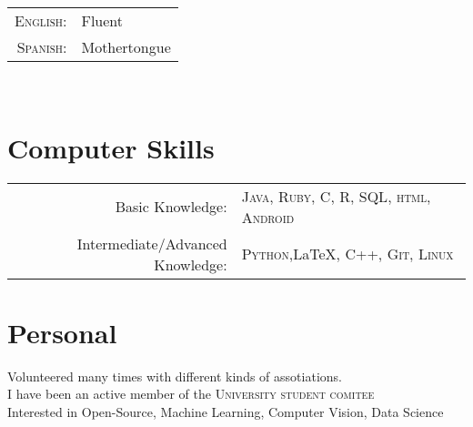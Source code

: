 \documentclass[a4paper,11pt]{article} %
\begin{document}
\begin{tabular}{rl}
\textsc{English:} & Fluent\\

\textsc{Spanish:} & Mothertongue\\
\end{tabular}\\


\section{Computer Skills}

\begin{tabular}{rl}
Basic Knowledge: & \textsc{Java}, \textsc{Ruby}, \textsc{C}, \textsc{R}, \textsc{SQL}, \textsc{html}, \textsc{Android}\\

Intermediate/Advanced Knowledge: & \textsc{Python},\LaTeX, \textsc{C++}, \textsc{Git}, \textsc{Linux}\\


\end{tabular}


\section{Personal}

Volunteered many times with different kinds of assotiations.\\
I have been an active member of the \textsc{University student comitee}\\
Interested in Open-Source, Machine Learning, Computer Vision, Data Science
\end{document}
